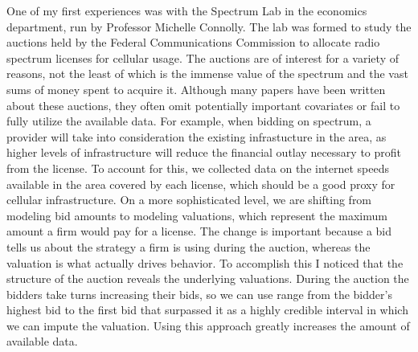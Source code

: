 \documentclass[12pt]{article}
\begin{document}
One of my first experiences was with the Spectrum Lab in the economics department, run by Professor Michelle Connolly.  The lab was formed to study the auctions held by the Federal Communications Commission to allocate radio spectrum licenses for cellular usage.  The auctions are of interest for a variety of reasons, not the least of which is the immense value of the spectrum and the vast sums of money spent to acquire it.  Although many papers have been written about these auctions, they often omit potentially important covariates or fail to fully utilize the available data.  For example, when bidding on spectrum, a provider will take into consideration the existing infrastucture in the area, as higher levels of infrastructure will reduce the financial outlay necessary to profit from the license.  To account for this, we collected data on the internet speeds available in the area covered by each license, which should be a good proxy for cellular infrastructure.  On a more sophisticated level, we are shifting from modeling bid amounts to modeling valuations, which represent the maximum amount a firm would pay for a license.  The change is important because a bid tells us about the strategy a firm is using during the auction, whereas the valuation is what actually drives behavior.  To accomplish this I noticed that the structure of the auction reveals the underlying valuations.  During the auction the bidders take turns increasing their bids, so we can use range from the bidder's highest bid to the first bid that surpassed it as a highly credible interval in which we can impute the valuation.  Using this approach greatly increases the amount of available data.
\end{document}
